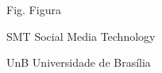 \begin{siglas}
  \item[Fig.] Figura
  \item[SMT] Social Media Technology
  \item[UnB] Universidade de Brasília
\end{siglas}
